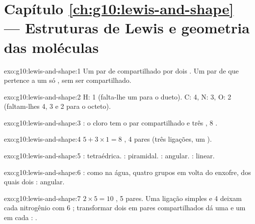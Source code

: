 \section*{Capítulo \ref{ch:g10:lewis-and-shape} --- Estruturas de Lewis e geometria das moléculas}

\begin{solution}{exo:g10:lewis-and-shape:1}
Um par de  compartilhado por dois . Um par de  que pertence a um só , sem ser compartilhado.
\end{solution}

\begin{solution}{exo:g10:lewis-and-shape:2}
H: 1 (falta-lhe um  para o dueto). C: 4, N: 3, O: 2 (faltam-lhes
4, 3 e 2  para o octeto).
\end{solution}

\begin{solution}{exo:g10:lewis-and-shape:3}
: o cloro tem o par compartilhado e três , 8 .
\end{solution}

\begin{solution}{exo:g10:lewis-and-shape:4}
$5 + 3 \times 1 = 8$ , 4 pares (três ligações, um ).
\end{solution}

\begin{solution}{exo:g10:lewis-and-shape:5}
: tetraédrica. : piramidal. : angular.
: linear.
\end{solution}

\begin{solution}{exo:g10:lewis-and-shape:6}
: como na água, quatro grupos em volta do enxofre,
dos quais dois : angular.
\end{solution}

\begin{solution}{exo:g10:lewis-and-shape:7}
$2 \times 5 = 10$ , 5 pares. Uma ligação simples e 4  deixam cada nitrogênio com 6 ; transformar dois  em pares compartilhados dá uma  e um  em cada :
.
\end{solution}

